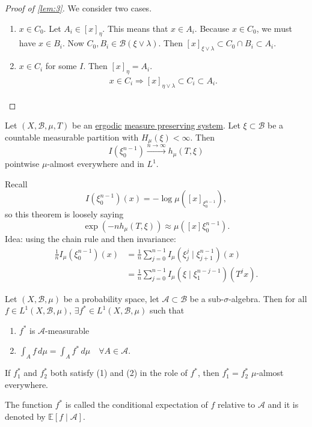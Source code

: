 \documentclass{article}
\begin{document}
\begin{proof}[Proof of \cref{lem:3}]
  We consider two cases.
  \begin{enumerate}
    \item $x \in C_0$. Let $A_i \in [x]_\eta$.
      This means that $x \in A_i$. Because $x \in C_0$, we must have $x \in B_i$.
      Now $C_0, B_i \in \mathcal{B}(\xi \vee \lambda)$.
      Then $[x]_{\xi \vee \lambda} \subset C_0 \cap B_i \subset A_i$.
    \item $x \in C_i$ for some $I$.
    Then $[x]_\eta = A_i$.
    \begin{align*}
      x \in C_i \Rightarrow [x]_{\eta \vee \lambda} \subset C_i \subset A_i.
    \end{align*} \qedhere
  \end{enumerate}
\end{proof}
\color{black}

\begin{thm}
  Let $(X,\mathcal{B},\mu,T)$ be an \hyperlink{def:ergodic}{ergodic} \hyperlink{def:mps}{measure preserving system}.
  Let $\xi \subset \mathcal{B}$ be a countable measurable partition with $H_\mu(\xi) < \infty$.
  Then
  \begin{equation*}
    I(\xi_0^{n-1}) \xrightarrow{n \to \infty} h_\mu(T, \xi)
  \end{equation*}
  pointwise $\mu$-almost everywhere and in $L^1$.
\end{thm}
Recall
\begin{equation*}
  I(\xi_0^{n-1})(x) = -\log \mu([x]_{\xi_0^{n-1}}),
\end{equation*}
so this theorem is loosely saying
\begin{equation*}
  \exp(-n h_\mu(T,\xi)) \approx \mu([x]\xi_0^{n-1}).
\end{equation*}
Idea: using the chain rule and then invariance:
\begin{align*}
  \frac{1}{n} I_\mu(\xi_0^{n-1})(x) &= \frac{1}{n} \sum_{j=0}^{n-1} I_\mu(\xi_j^j \mid \xi_{j+1}^{n-1})(x) \\
                                    &= \frac{1}{n} \sum_{j=0}^{n-1} I_\mu(\xi \mid \xi_1^{n-j-1})(T^j x).
\end{align*}
\begin{defi}
  Let $(X,\mathcal{B},\mu)$ be a probability space, let $\mathcal{A} \subset \mathcal{B}$ be a sub-$\sigma$-algebra.
  Then for all $f \in L^1(X, \mathcal{B}, \mu)$, $\exists f^* \in L^1(X, \mathcal{B},\mu)$ such that
  \begin{enumerate}[label=(\arabic*)]
    \item $f^*$ is $\mathcal{A}$-measurable
    \item $\int_A f \, d\mu = \int_A f^* \, d\mu \quad \forall A \in \mathcal{A}$.
  \end{enumerate}

  If $f_1^*$ and $f_2^*$ both satisfy (1) and (2) in the role of $f^*$, then $f_1^* = f_2^*$ $\mu$-almost everywhere.

  The function $f^*$ is called the conditional expectation of $f$ relative to $\mathcal{A}$ and it is denoted by $\mathbb{E}[f \mid \mathcal{A}]$.
\end{defi}
\end{document}
